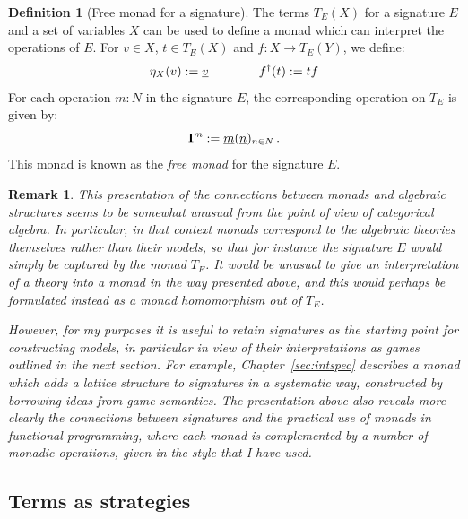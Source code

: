 \documentclass[11pt,oneside,draft]{book}
\newtheorem{remark}[theorem]{Remark}
\theoremstyle{definition}
\newtheorem{definition}[theorem]{Definition}
\newcommand{\ul}[1]{%
  \underline{\smash{#1}}
}
\begin{document}
\begin{definition}[Free monad for a signature]
The terms $T_E(X)$
for a signature $E$ and a set of variables $X$
can be used to define a monad
which can interpret the operations of $E$.
For $v \in X$, $t \in T_E(X)$ and $f : X \rightarrow T_E(Y)$,
we define:
\[
  \eta_X(v) := \ul{v}
  \qquad \qquad
  f^\dagger(t) := t f
\]
For each operation $m : N$ in the signature $E$,
the corresponding operation on $T_E$
is given by:
\[
  \mathbf{I}^m := \ul{m}(\ul{n})_{n \in N}
  \,.
\]
This monad is known as the \emph{free monad}
for the signature $E$.
\end{definition}

\begin{remark}
This presentation
of the connections between monads and algebraic structures
seems to be somewhat unusual from the point of view of
categorical algebra.
In particular,
in that context monads correspond to
the algebraic theories themselves
rather than their models,
so that for instance the signature $E$
would simply be captured by the monad $T_E$.
It would be unusual to give an interpretation of a theory
\emph{into} a monad in the way presented above,
and this would perhaps be formulated instead
as a monad homomorphism out of $T_E$.

However,
for my purposes it is useful to retain signatures
as the starting point for constructing models,
in particular in view of their interpretations as games
outlined in the next section.
For example,
Chapter~\ref{sec:intspec}
describes a monad which adds
a lattice structure to signatures in a systematic way,
constructed by borrowing ideas from game semantics.
The presentation above also
reveals more clearly the connections between signatures
and the practical use of monads in functional programming,
where each monad is complemented by
a number of monadic operations,
given in the style that I have used.
\end{remark}


\subsection{Terms as strategies} %
\end{document}
